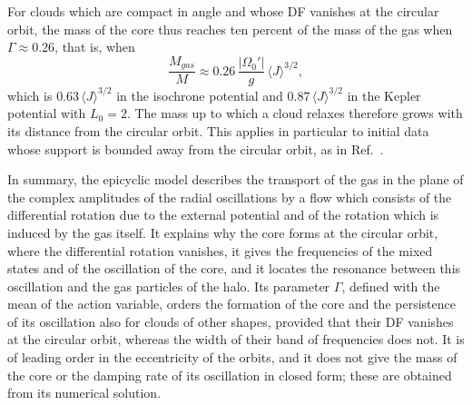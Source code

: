 For clouds which are compact in angle and whose DF vanishes at the circular orbit, the mass of the core thus reaches ten percent of the mass of the gas when $\Gamma\approx 0.26$, that is, when
\begin{equation}
\frac{M_{gas}}{M}\approx 0.26\,\frac{|\Omega_0'|}{g}\,\langle J\rangle^{3/2},
\label{Eq:MassThreshold}
\end{equation}
which is $0.63\,\langle J\rangle^{3/2}$ in the isochrone potential and $0.87\,\langle J\rangle^{3/2}$ in the Kepler potential with $L_0 = 2$. The mass up to which a cloud relaxes therefore grows with its distance from the circular orbit. This applies in particular to initial data whose support is bounded away from the circular orbit, as in Ref.~\cite{sCjL26}.

In summary, the epicyclic model describes the transport of the gas in the plane of the complex amplitudes of the radial oscillations by a flow which consists of the differential rotation due to the external potential and of the rotation which is induced by the gas itself. It explains why the core forms at the circular orbit, where the differential rotation vanishes, it gives the frequencies of the mixed states and of the oscillation of the core, and it locates the resonance between this oscillation and the gas particles of the halo. Its parameter $\Gamma$, defined with the mean of the action variable, orders the formation of the core and the persistence of its oscillation also for clouds of other shapes, provided that their DF vanishes at the circular orbit, whereas the width of their band of frequencies does not. It is of leading order in the eccentricity of the orbits, and it does not give the mass of the core or the damping rate of its oscillation in closed form; these are obtained from its numerical solution.
